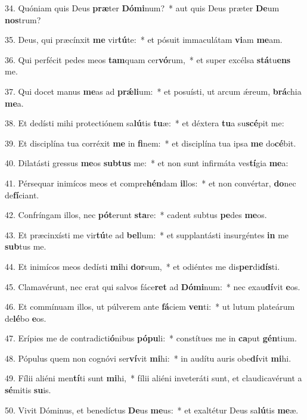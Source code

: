 34. Quóniam quis Deus \textbf{præ}ter \textbf{Dó}\textbf{mi}num?~*  aut quis Deus præter \textbf{De}um \textbf{nos}trum?\

35. Deus, qui præcínxit \textbf{me} vir\textbf{tú}te:~*  et pósuit immaculátam \textbf{vi}am \textbf{me}am.\

36. Qui perfécit pedes meos \textbf{tam}quam cer\textbf{vó}rum,~*  et super excélsa \textbf{stá}tu\textbf{ens} me.\

37. Qui docet manus \textbf{me}as ad \textbf{prǽ}\textbf{li}um:~*  et posuísti, ut arcum ǽreum, \textbf{brá}chia \textbf{me}a.\

38. Et dedísti mihi protectiónem sa\textbf{lú}tis \textbf{tu}æ:~*  et déxtera \textbf{tu}a su\textbf{scé}pit me:\

39. Et disciplína tua corréxit \textbf{me} in \textbf{fi}nem:~*  et disciplína tua ipsa \textbf{me} do\textbf{cé}bit.\

40. Dilatásti gressus \textbf{me}os \textbf{sub}\textbf{tus} me:~*  et non sunt infirmáta ves\textbf{tí}gia \textbf{me}a:\

41. Pérsequar inimícos meos et compre\textbf{hén}dam \textbf{il}los:~*  et non convértar, \textbf{do}nec de\textbf{fí}ciant.\

42. Confríngam illos, nec \textbf{pót}erunt \textbf{sta}re:~*  cadent subtus \textbf{pe}des \textbf{me}os.\

43. Et præcinxísti me vir\textbf{tú}te ad \textbf{bel}lum:~*  et supplantásti insurgéntes \textbf{in} me \textbf{sub}tus me.\

44. Et inimícos meos dedísti \textbf{mi}hi \textbf{dor}sum,~*  et odiéntes me dis\textbf{per}di\textbf{dís}ti.\

45. Clamavérunt, nec erat qui salvos fáce\textbf{ret} ad \textbf{Dó}\textbf{mi}num:~*  nec exau\textbf{dí}vit \textbf{e}os.\

46. Et commínuam illos, ut púlverem ante \textbf{fá}ciem \textbf{ven}ti:~*  ut lutum plateárum de\textbf{lé}bo \textbf{e}os.\

47. Erípies me de contradicti\textbf{ó}nibus \textbf{pó}\textbf{pu}li:~*  constítues me in \textbf{ca}put \textbf{gén}tium.\

48. Pópulus quem non cognóvi ser\textbf{ví}vit \textbf{mi}hi:~*  in audítu auris obe\textbf{dí}vit \textbf{mi}hi.\

49. Fílii aliéni men\textbf{tí}ti sunt \textbf{mi}hi,~*  fílii aliéni inveteráti sunt, et claudicavérunt a \textbf{sé}mitis \textbf{su}is.\

50. Vivit Dóminus, et benedíctus \textbf{De}us \textbf{me}us:~*  et exaltétur Deus sa\textbf{lú}tis \textbf{me}æ.\

